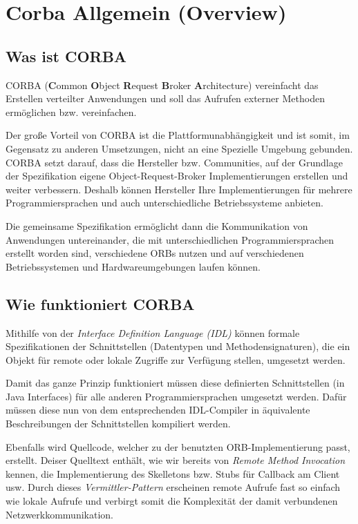 \section{Corba Allgemein (Overview)}
\label{sec:Corba Allgemein (Overview)}


	\subsection{Was ist CORBA \cite{omniOrb} \cite{corbaWiki}}

	CORBA (\textbf{C}ommon \textbf{O}bject \textbf{R}equest \textbf{B}roker \textbf{A}rchitecture) vereinfacht das Erstellen verteilter Anwendungen und soll das Aufrufen externer Methoden ermöglichen bzw. vereinfachen.
	
	Der große Vorteil von CORBA ist die Plattformunabhängigkeit und ist somit, im Gegensatz zu anderen Umsetzungen, nicht an eine Spezielle Umgebung gebunden.
	CORBA setzt darauf, dass die Hersteller bzw. Communities, auf der Grundlage der Spezifikation eigene Object-Request-Broker Implementierungen erstellen und weiter verbessern. Deshalb können Hersteller Ihre Implementierungen für mehrere Programmiersprachen und auch unterschiedliche Betriebssysteme anbieten.
	
	Die gemeinsame Spezifikation ermöglicht dann die Kommunikation von Anwendungen untereinander, die mit unterschiedlichen Programmiersprachen erstellt worden sind, verschiedene ORBs nutzen und auf verschiedenen Betriebssystemen und Hardwareumgebungen laufen können.

	\subsection{Wie funktioniert CORBA \cite{omniOrb} \cite{corbaWiki}}
	
	Mithilfe von der \textit{Interface Definition Language (IDL)} können formale Spezifikationen der Schnittstellen (Datentypen und Methodensignaturen), die ein Objekt für remote oder lokale Zugriffe zur Verfügung stellen, umgesetzt werden.
	
	Damit das ganze Prinzip funktioniert müssen diese definierten Schnittstellen (in Java Interfaces) für alle anderen Programmiersprachen umgesetzt werden.
	Dafür müssen diese nun von dem entsprechenden IDL-Compiler in äquivalente Beschreibungen der Schnittstellen kompiliert werden.
	
	Ebenfalls wird Quellcode, welcher zu der benutzten ORB-Implementierung passt, erstellt. Deiser Quelltext enthält, wie wir bereits von \textit{Remote Method Invocation} kennen, die Implementierung des Skelletons bzw. Stubs für Callback am Client usw. Durch dieses \textit{Vermittler-Pattern} erscheinen remote Aufrufe fast so einfach wie lokale Aufrufe und verbirgt somit die Komplexität der damit verbundenen Netzwerkkommunikation.
	
